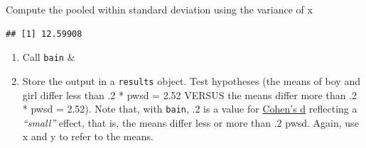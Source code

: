 \documentclass[
]{book}
\newenvironment{Shaded}{\begin{snugshade}}{\end{snugshade}}
\newcommand{\AttributeTok}[1]{\textcolor[rgb]{0.77,0.63,0.00}{#1}}
\newcommand{\CommentTok}[1]{\textcolor[rgb]{0.56,0.35,0.01}{\textit{#1}}}
\newcommand{\ConstantTok}[1]{\textcolor[rgb]{0.00,0.00,0.00}{#1}}
\newcommand{\DecValTok}[1]{\textcolor[rgb]{0.00,0.00,0.81}{#1}}
\newcommand{\FunctionTok}[1]{\textcolor[rgb]{0.00,0.00,0.00}{#1}}
\newcommand{\NormalTok}[1]{#1}
\newcommand{\OtherTok}[1]{\textcolor[rgb]{0.56,0.35,0.01}{#1}}
\newcommand{\SpecialCharTok}[1]{\textcolor[rgb]{0.00,0.00,0.00}{#1}}
\begin{document}
\begin{Shaded}
\end{Shaded}

Compute the pooled within standard deviation using the variance of x

\begin{Shaded}
\end{Shaded}

\begin{verbatim}
## [1] 12.59908
\end{verbatim}

\begin{enumerate}
\def\labelenumi{\arabic{enumi})}
\setcounter{enumi}{1}
\item
  Call \texttt{bain} \&
\item
  Store the output in a \texttt{results} object.
  Test hypotheses (the means of boy and girl differ less than .2 * pwsd =
  2.52 VERSUS the means differ more than .2 * pwsd = 2.52).
  Note that, with \texttt{bain}, .2 is a value for \href{https://en.wikiversity.org/wiki/Cohen\%27s_d\#:~:text=Cohen's\%20d\%20is\%20an\%20effect,the\%20comparison\%20between\%20two\%20means.}{Cohen's d} reflecting a \emph{``small''} effect, that
  is, the means differ less or more than .2 pwsd. Again, use x and y to refer to the means.
\end{enumerate}
\end{document}
